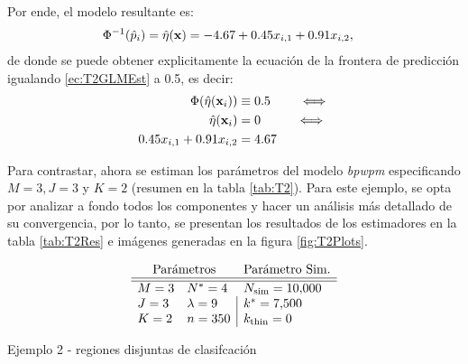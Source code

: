 \documentclass[../Main/Main.tex]{subfiles}
\begin{document}
Por ende, el modelo resultante es:
\begin{align}
 \Phi^{-1}(\hat{p}_i) &= \hat{\eta}(\mathbf{x}) = -4.67 + 0.45x_{i,1} + 0.91x_{i,2}, \label{ec:T2GLMEst}
\end{align}
de donde se puede obtener explicitamente la ecuación de la frontera de predicción igualando \eqref{ec:T2GLMEst} a 0.5, es decir:
\begin{align}
	\Phi(\hat{\eta}(\mathbf{x}_i)) &\equiv 0.5 \qquad \iff \nonumber \\
	\hat{\eta}(\mathbf{x}_i) &= 0 \;\;\qquad \iff  \nonumber \\
	0.45x_{i,1} + 0.91x_{i,2} &= 4.67  \label{ec:T2RectaGLM}
\end{align}

Para contrastar, ahora se estiman los parámetros del modelo \textit{bpwpm} especificando $M = 3, J = 3$ y $K =2$ (resumen en la tabla \ref{tab:T2}). Para este ejemplo, se opta por analizar a fondo todos los componentes y hacer un análisis más detallado de su convergencia, por lo tanto, se presentan los resultados de los estimadores en la tabla \ref{tab:T2Res} e imágenes generadas en la figura \ref{fig:T2Plots}.
\begin{table}[h]
$$\paramsmod{3}{3}{2}{4}{9}{350}{\num{10000}}{\num{7500}}{0}$$
\caption{Ejemplo 2 - regiones disjuntas de clasifcación}
\label{tab:T2}
\end{table}
\end{document}
